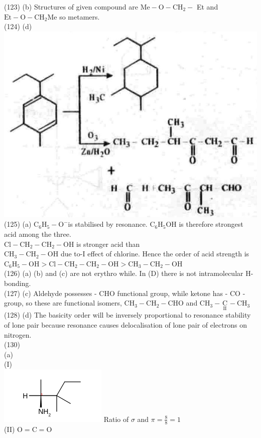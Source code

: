 \documentclass[10pt]{article}
\begin{document}
(123) (b) Structures of given compound are $\mathrm{Me}-\mathrm{O}-\mathrm{CH}_{2}-$ Et and $\mathrm{Et}-\mathrm{O}-\mathrm{CH}_{2} \mathrm{Me}$ so metamers.\\
(124) (d)\\
\includegraphics[max width=\textwidth, center]{2025_01_28_8470952b98110cec3aabg-162}\\
(125) (a) $\mathrm{C}_{6} \mathrm{H}_{5}-\mathrm{O}^{-}$is stabilised by resonance. $\mathrm{C}_{6} \mathrm{H}_{5} \mathrm{OH}$ is therefore strongest acid among the three.\\
$\mathrm{Cl}-\mathrm{CH}_{2}-\mathrm{CH}_{2}-\mathrm{OH}$ is stronger acid than\\
$\mathrm{CH}_{3}-\mathrm{CH}_{2}-\mathrm{OH}$ due to-I effect of chlorine. Hence the order of acid strength is\\
$\mathrm{C}_{6} \mathrm{H}_{5}-\mathrm{OH}>\mathrm{Cl}-\mathrm{CH}_{2}-\mathrm{CH}_{2}-\mathrm{OH}>\mathrm{CH}_{3}-\mathrm{CH}_{2}-\mathrm{OH}$\\
(126) (a) (b) and (c) are not erythro while. In (D) there is not intramolecular H-bonding.\\
(127) (c) Aldehyde possesses - CHO functional group, while ketone has - CO -group, so these are functional isomers, $\mathrm{CH}_{3}-\mathrm{CH}_{2}-\mathrm{CHO}$ and $\mathrm{CH}_{3}-\underset{\text { II }}{\mathrm{C}}-\mathrm{CH}_{3}$\\
(128) (d) The basicity order will be inversely proportional to resonance stability of lone pair because resonance causes delocalisation of lone pair of electrons on nitrogen.\\
(130)\\
(a)\\
(I)\\
\includegraphics{smile-f4c790b4fb21f5ffc7fada6cab79bec0e63e692f} Ratio of $\sigma$ and $\pi=\frac{8}{8}=1$\\
(II) $\mathrm{O}=\mathrm{C}=\mathrm{O}$
\end{document}
